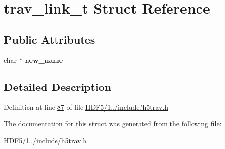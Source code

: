 \hypertarget{structtrav__link__t}{}\section{trav\+\_\+link\+\_\+t Struct Reference}
\label{structtrav__link__t}
\subsection*{Public Attributes}
\begin{DoxyCompactItemize}
\item 
\mbox{\label{structtrav__link__t_ad835fc84f2f035143070e369e3b88cf8}} 
char $\ast$ {\bfseries new\+\_\+name}
\end{DoxyCompactItemize}


\subsection{Detailed Description}


Definition at line \hyperlink{_h_d_f5_21_810_81_2include_2h5trav_8h_source_l00087}{87} of file \hyperlink{_h_d_f5_21_810_81_2include_2h5trav_8h_source}{H\+D\+F5/1../include/h5trav.\+h}.



The documentation for this struct was generated from the following file\+:\begin{DoxyCompactItemize}
\item 
H\+D\+F5/1../include/h5trav.\+h\end{DoxyCompactItemize}
